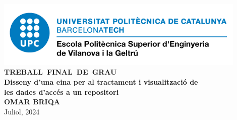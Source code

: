 \begin{titlepage}
    \begin{center}

        \vspace*{-3cm}
        \includegraphics[width=0.9\textwidth]{figures/epsevg-logo} \\ [1cm]

        \Huge
        \vspace{1cm}
        \textbf{\mbox{TREBALL FINAL DE GRAU}} \\ [3cm]

        \Huge
        \textbf{Disseny d'una eina per al tractament i visualització de \\ les dades d'accés a un repositori} \\ [2cm]

        \huge
        \textbf{OMAR BRIQA} \\ [3cm]
        Juliol, 2024

    \end{center}
\end{titlepage}
